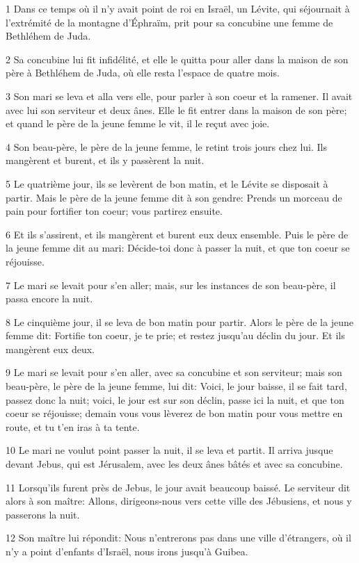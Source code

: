\par 1 Dans ce temps où il n'y avait point de roi en Israël, un Lévite, qui séjournait à l'extrémité de la montagne d'Éphraïm, prit pour sa concubine une femme de Bethléhem de Juda.
\par 2 Sa concubine lui fit infidélité, et elle le quitta pour aller dans la maison de son père à Bethléhem de Juda, où elle resta l'espace de quatre mois.
\par 3 Son mari se leva et alla vers elle, pour parler à son coeur et la ramener. Il avait avec lui son serviteur et deux ânes. Elle le fit entrer dans la maison de son père; et quand le père de la jeune femme le vit, il le reçut avec joie.
\par 4 Son beau-père, le père de la jeune femme, le retint trois jours chez lui. Ils mangèrent et burent, et ils y passèrent la nuit.
\par 5 Le quatrième jour, ils se levèrent de bon matin, et le Lévite se disposait à partir. Mais le père de la jeune femme dit à son gendre: Prends un morceau de pain pour fortifier ton coeur; vous partirez ensuite.
\par 6 Et ils s'assirent, et ils mangèrent et burent eux deux ensemble. Puis le père de la jeune femme dit au mari: Décide-toi donc à passer la nuit, et que ton coeur se réjouisse.
\par 7 Le mari se levait pour s'en aller; mais, sur les instances de son beau-père, il passa encore la nuit.
\par 8 Le cinquième jour, il se leva de bon matin pour partir. Alors le père de la jeune femme dit: Fortifie ton coeur, je te prie; et restez jusqu'au déclin du jour. Et ils mangèrent eux deux.
\par 9 Le mari se levait pour s'en aller, avec sa concubine et son serviteur; mais son beau-père, le père de la jeune femme, lui dit: Voici, le jour baisse, il se fait tard, passez donc la nuit; voici, le jour est sur son déclin, passe ici la nuit, et que ton coeur se réjouisse; demain vous vous lèverez de bon matin pour vous mettre en route, et tu t'en iras à ta tente.
\par 10 Le mari ne voulut point passer la nuit, il se leva et partit. Il arriva jusque devant Jebus, qui est Jérusalem, avec les deux ânes bâtés et avec sa concubine.
\par 11 Lorsqu'ils furent près de Jebus, le jour avait beaucoup baissé. Le serviteur dit alors à son maître: Allons, dirigeons-nous vers cette ville des Jébusiens, et nous y passerons la nuit.
\par 12 Son maître lui répondit: Nous n'entrerons pas dans une ville d'étrangers, où il n'y a point d'enfants d'Israël, nous irons jusqu'à Guibea.
